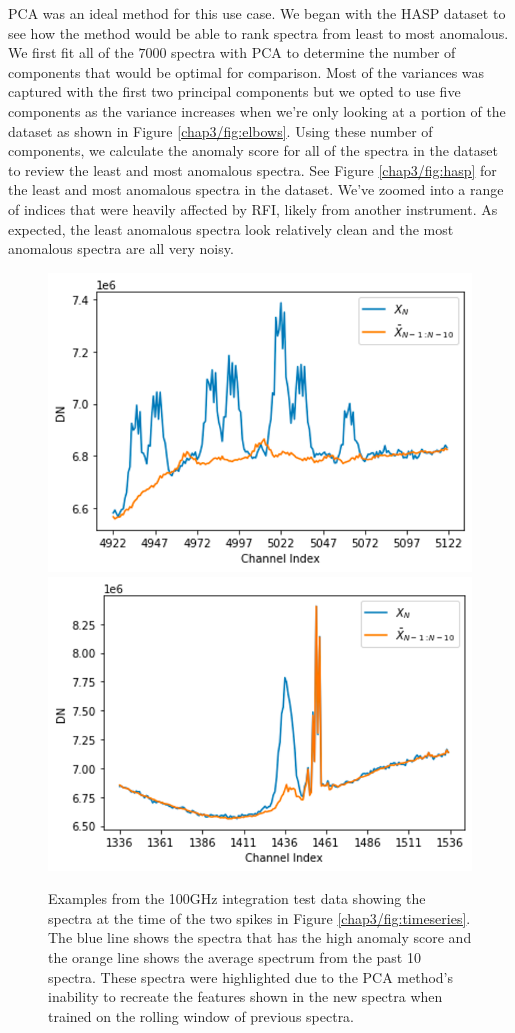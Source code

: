 PCA was an ideal method for this use case. 
We began with the HASP dataset to see how the method would be able to rank spectra from least to most anomalous.
We first fit all of the $7000$ spectra with PCA to determine the number of components that would be optimal for comparison.
Most of the variances was captured with the first two principal components but we opted to use five components as the variance increases when we're only looking at a portion of the dataset as shown in Figure \ref{chap3/fig:elbows}.
Using these number of components, we calculate the anomaly score for all of the spectra in the dataset to review the least and most anomalous spectra. 
See Figure \ref{chap3/fig:hasp} for the least and most anomalous spectra in the dataset. 
We've zoomed into a range of indices that were heavily affected by RFI, likely from another instrument. 
As expected, the least anomalous spectra look relatively clean and the most anomalous spectra are all very noisy. 

\begin{figure}[t]
    \centering
    \includegraphics[width=0.49\linewidth]{figs/3/pca1.png}
    \includegraphics[width=0.49\linewidth]{figs/3/pca2.png}
    \caption{Examples from the 100GHz integration test data showing the spectra at the time of the two spikes in Figure \ref{chap3/fig:timeseries}. The blue line shows the spectra that has the high anomaly score and the orange line shows the average spectrum from the past 10 spectra. These spectra were highlighted due to the PCA method's inability to recreate the features shown in the new spectra when trained on the rolling window of previous spectra.}
    \label{chap3/fig:100ghz}
\end{figure}

